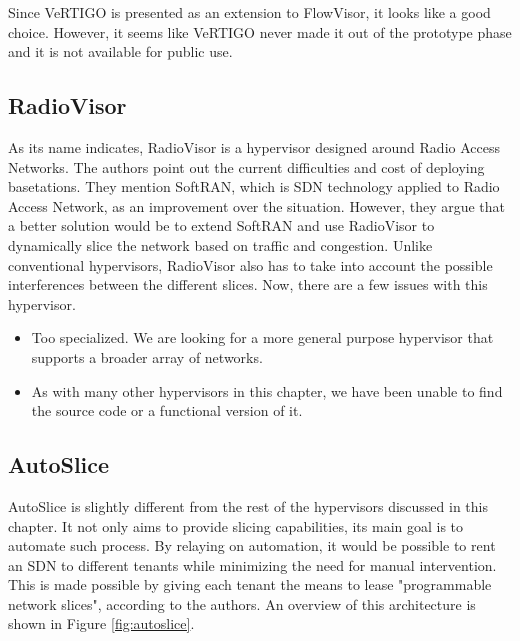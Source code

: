 Since VeRTIGO is presented as an extension to FlowVisor, it looks like a good choice. However, it seems like VeRTIGO never made it out of the prototype phase and it is not available for public use.

 \subsection{RadioVisor}
 As its name indicates, RadioVisor\cite{radiovisor} is a hypervisor designed around Radio Access Networks. The authors point out the current difficulties and cost of deploying basetations. They mention SoftRAN\cite{softran}, which is SDN technology applied to Radio Access Network, as an improvement over the situation. However, they argue that a better solution would be to extend SoftRAN and use RadioVisor to dynamically slice the network based on traffic and congestion. Unlike conventional hypervisors, RadioVisor also has to take into account the possible interferences between the different slices. Now, there are a few issues with this hypervisor.
\begin{itemize}
    \item Too specialized. We are looking for a more general purpose hypervisor that supports a broader array of networks.
    \item As with many other hypervisors in this chapter, we have been unable to find the source code or a functional version of it.
\end{itemize}

\subsection{AutoSlice}
AutoSlice\cite{autoslice} is slightly different from the rest of the hypervisors discussed in this chapter. It not only aims to provide slicing capabilities, its main goal is to automate such process. By relaying on automation, it would be possible to rent an SDN to different tenants while minimizing the need for manual intervention. This is made possible by giving each tenant the means to lease "programmable network slices", according to the authors. An overview of this architecture is shown in Figure \ref{fig:autoslice}.

